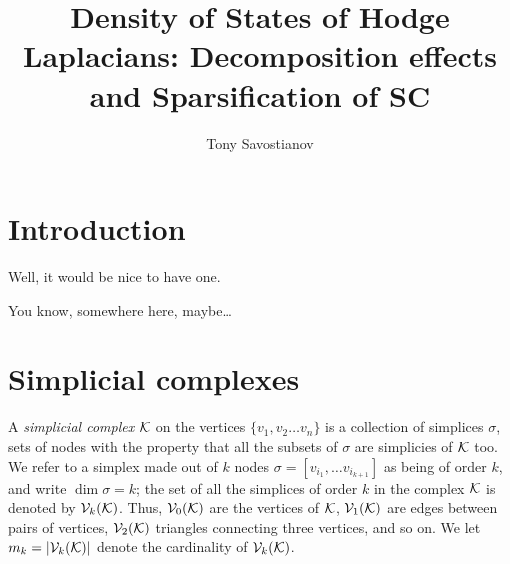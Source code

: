 \documentclass{mynotes}
\title{Density of States of Hodge Laplacians: Decomposition effects and Sparsification of SC}
\author[1]{ Tony Savostianov }
\affil[1]{ RWTH, Aachen   \\ email: \email{a.s.savostyanov@gmail.com} }
\begin{document}
\maketitle


\chapter{Introduction}

Well, it would be nice to have one. 

You know, somewhere here, maybe\dots


\chapter{ Simplicial complexes }

A \emph{simplicial complex} \( \mathcal{K} \) on the vertices \( \{ v_1, v_2 \ldots v_n \} \) is a collection of simplices \( \sigma \), sets of nodes with the property that all the subsets of $\sigma$ are simplicies of $\mathcal{K}$ too.   
We refer to a simplex made out of $k$ nodes \( \sigma = [ v_{i_1}, \ldots v_{i_{k+1}} ] \) as being of order \( k \), and write \( \dim \sigma = k \); the set of all the simplices of order \( k \) in the complex \( \mathcal{K} \) is denoted by \( \mathcal{V}_{k}(\mathcal{K}) \). Thus, \( \mathcal{V}_{0}(\mathcal{K}) \) are the vertices of $\mathcal{K}$, \( \mathcal{V}_{1}(\mathcal{K}) \) are edges between pairs of vertices, \( \mathcal{V}_{2}(\mathcal{K}) \) triangles connecting three vertices, and so on. We let \( m_k = | \mathcal{V}_{k}(\mathcal{K}) | \) denote the cardinality of \( \mathcal{V}_{k}(\mathcal{K})\).
\end{document}
